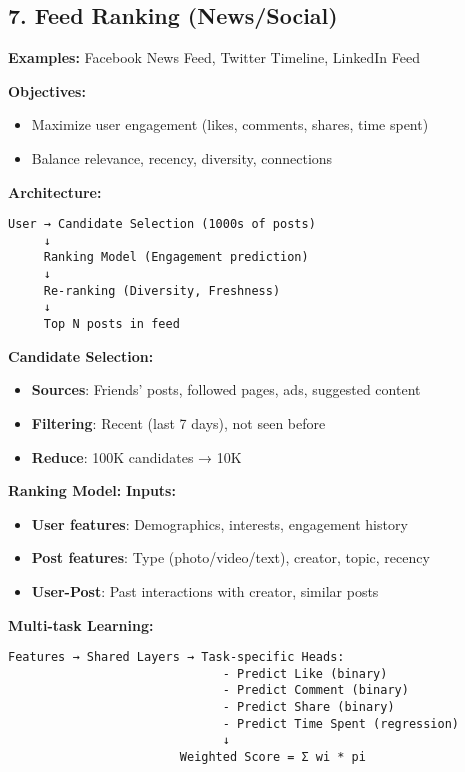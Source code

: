 \documentclass[8pt,landscape]{article}
\begin{document}
\begin{multicols}{3}
\subsection*{7. Feed Ranking (News/Social)}
\textbf{Examples:} Facebook News Feed, Twitter Timeline, LinkedIn Feed

\textbf{Objectives:}
\begin{itemize}
\item Maximize user engagement (likes, comments, shares, time spent)
\item Balance relevance, recency, diversity, connections
\end{itemize}

\textbf{Architecture:}
\begin{verbatim}
User → Candidate Selection (1000s of posts)
     ↓
     Ranking Model (Engagement prediction)
     ↓
     Re-ranking (Diversity, Freshness)
     ↓
     Top N posts in feed
\end{verbatim}

\textbf{Candidate Selection:}
\begin{itemize}
\item \textbf{Sources}: Friends' posts, followed pages, ads, suggested content
\item \textbf{Filtering}: Recent (last 7 days), not seen before
\item \textbf{Reduce}: 100K candidates → 10K
\end{itemize}

\textbf{Ranking Model:}
\textbf{Inputs:}
\begin{itemize}
\item \textbf{User features}: Demographics, interests, engagement history
\item \textbf{Post features}: Type (photo/video/text), creator, topic, recency
\item \textbf{User-Post}: Past interactions with creator, similar posts
\end{itemize}

\textbf{Multi-task Learning:}
\begin{verbatim}
Features → Shared Layers → Task-specific Heads:
                              - Predict Like (binary)
                              - Predict Comment (binary)
                              - Predict Share (binary)
                              - Predict Time Spent (regression)
                              ↓
                        Weighted Score = Σ wi * pi
\end{verbatim}


\end{multicols}
\end{document}
